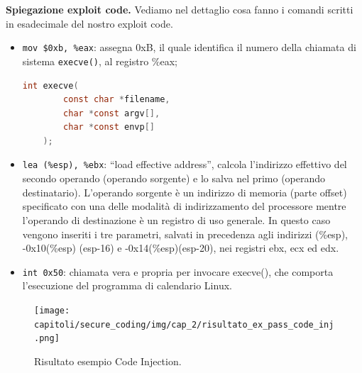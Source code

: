 \textbf{Spiegazione exploit code.} Vediamo nel dettaglio cosa fanno i comandi scritti
in esadecimale del nostro exploit code.

\begin{itemize}
    \item \verb|mov $0xb, %eax|: assegna 0xB, il quale identifica il numero della chiamata
          di sistema \verb|execve()|, al registro \%eax; \\
          \begin{lstlisting}[language=C]
    int execve(
        const char *filename, 
        char *const argv[], 
        char *const envp[]
    );\end{lstlisting}
    \item \verb|lea (%esp), %ebx|: ``load effective address'', calcola l'indirizzo
          effettivo del secondo operando (operando sorgente) e lo salva nel primo (operando destinatario).
          L'operando sorgente è un indirizzo di memoria (parte offset) specificato con una delle
          modalità di indirizzamento del processore mentre l'operando di destinazione è un
          registro di uso generale. In questo caso vengono inseriti i tre parametri,
          salvati in precedenza agli
          indirizzi (\%esp), -0x10(\%esp) (esp-16) e -0x14(\%esp)(esp-20), nei registri
          ebx, ecx ed edx.
          \item\verb|int 0x50|: chiamata vera e propria  per invocare execve(), che
          comporta l'esecuzione del programma di calendario Linux.
\end{itemize}

\begin{figure}[H]
    \centering
    \texttt{[image: capitoli/secure\_coding/img/cap\_2/risultato\_ex\_pass\_code\_inj.png]}
    \caption{Risultato esempio Code Injection.}\label{fig:ris_es_pass_ok_code_inj}
\end{figure}




